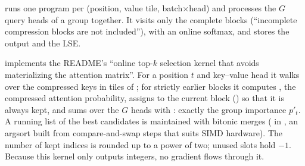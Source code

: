 \begin{implnote}[title={In the code: the compression and top-$k$ kernels}]
 runs one program per (position, value tile,
batch$\times$head) and processes the $G$ query heads of a group together. It visits only the
 complete blocks (``incomplete compression blocks are not
included''), with an online softmax, and stores the output and the LSE.

 implements the README's ``online top-$k$ selection kernel that
avoids materializing the attention matrix''. For a position $t$ and key--value head it walks over
the compressed keys in tiles of ; for strictly earlier blocks it computes
, the compressed attention probability, assigns
 to the current block () so that it is always kept, and
sums over the $G$ heads with : exactly the group importance $p'_t$. A
running list of the best candidates is maintained with bitonic merges ( in
, an
argsort built from compare-and-swap steps that suits SIMD hardware). The number of kept indices
is rounded up to a power of two; unused slots hold $-1$. Because this kernel only outputs
integers, no gradient flows through it.
\end{implnote}

